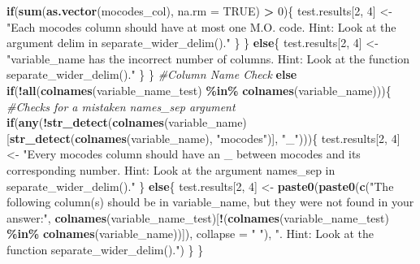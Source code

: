\documentclass[
  12pt,
]{book}
\newenvironment{Shaded}{\begin{snugshade}}{\end{snugshade}}
\newcommand{\AttributeTok}[1]{\textcolor[rgb]{0.13,0.29,0.53}{#1}}
\newcommand{\CommentTok}[1]{\textcolor[rgb]{0.56,0.35,0.01}{\textit{#1}}}
\newcommand{\ConstantTok}[1]{\textcolor[rgb]{0.56,0.35,0.01}{#1}}
\newcommand{\ControlFlowTok}[1]{\textcolor[rgb]{0.13,0.29,0.53}{\textbf{#1}}}
\newcommand{\DecValTok}[1]{\textcolor[rgb]{0.00,0.00,0.81}{#1}}
\newcommand{\FunctionTok}[1]{\textcolor[rgb]{0.13,0.29,0.53}{\textbf{#1}}}
\newcommand{\NormalTok}[1]{#1}
\newcommand{\OtherTok}[1]{\textcolor[rgb]{0.56,0.35,0.01}{#1}}
\newcommand{\SpecialCharTok}[1]{\textcolor[rgb]{0.81,0.36,0.00}{\textbf{#1}}}
\newcommand{\StringTok}[1]{\textcolor[rgb]{0.31,0.60,0.02}{#1}}
\begin{document}
\begin{Shaded}
\begin{Highlighting}[]
    \ControlFlowTok{if}\NormalTok{(}\FunctionTok{sum}\NormalTok{(}\FunctionTok{as.vector}\NormalTok{(mocodes\_col), }\AttributeTok{na.rm =} \ConstantTok{TRUE}\NormalTok{) }\SpecialCharTok{\textgreater{}} \DecValTok{0}\NormalTok{)\{}
\NormalTok{      test.results[}\DecValTok{2}\NormalTok{, }\DecValTok{4}\NormalTok{] }\OtherTok{\textless{}{-}} \StringTok{"Each \textasciigrave{}mocodes\textasciigrave{} column should have at most one M.O. code. Hint: Look at the argument \textasciigrave{}delim\textasciigrave{} in \textasciigrave{}separate\_wider\_delim()\textasciigrave{}."}
\NormalTok{    \}}
\NormalTok{  \}}
  \ControlFlowTok{else}\NormalTok{\{}
\NormalTok{    test.results[}\DecValTok{2}\NormalTok{, }\DecValTok{4}\NormalTok{] }\OtherTok{\textless{}{-}} \StringTok{"\textasciigrave{}variable\_name\textasciigrave{} has the incorrect number of columns. Hint: Look at the function \textasciigrave{}separate\_wider\_delim()\textasciigrave{}."}
\NormalTok{  \}}
\NormalTok{\}}
\CommentTok{\#Column Name Check  }
\ControlFlowTok{else} \ControlFlowTok{if}\NormalTok{(}\SpecialCharTok{!}\FunctionTok{all}\NormalTok{(}\FunctionTok{colnames}\NormalTok{(variable\_name\_test) }\SpecialCharTok{\%in\%} \FunctionTok{colnames}\NormalTok{(variable\_name)))\{}
  \CommentTok{\#Checks for a mistaken \textasciigrave{}names\_sep\textasciigrave{} argument }
  \ControlFlowTok{if}\NormalTok{(}\FunctionTok{any}\NormalTok{(}\SpecialCharTok{!}\FunctionTok{str\_detect}\NormalTok{(}\FunctionTok{colnames}\NormalTok{(variable\_name)[}\FunctionTok{str\_detect}\NormalTok{(}\FunctionTok{colnames}\NormalTok{(variable\_name), }\StringTok{"mocodes"}\NormalTok{)], }\StringTok{"\_"}\NormalTok{)))\{}
\NormalTok{    test.results[}\DecValTok{2}\NormalTok{, }\DecValTok{4}\NormalTok{] }\OtherTok{\textless{}{-}} \StringTok{"Every \textasciigrave{}mocodes\textasciigrave{} column should have an \textasciigrave{}\_\textasciigrave{} between \textasciigrave{}mocodes\textasciigrave{} and its corresponding number. Hint: Look at the argument \textasciigrave{}names\_sep\textasciigrave{} in \textasciigrave{}separate\_wider\_delim().\textasciigrave{}"}
\NormalTok{  \} }
  \ControlFlowTok{else}\NormalTok{\{}
\NormalTok{    test.results[}\DecValTok{2}\NormalTok{, }\DecValTok{4}\NormalTok{] }\OtherTok{\textless{}{-}} \FunctionTok{paste0}\NormalTok{(}\FunctionTok{paste0}\NormalTok{(}\FunctionTok{c}\NormalTok{(}\StringTok{"The following column(s) should be in \textasciigrave{}variable\_name\textasciigrave{}, but they were not found in your answer:"}\NormalTok{,}
                                   \FunctionTok{colnames}\NormalTok{(variable\_name\_test)[}\SpecialCharTok{!}\NormalTok{(}\FunctionTok{colnames}\NormalTok{(variable\_name\_test) }\SpecialCharTok{\%in\%} \FunctionTok{colnames}\NormalTok{(variable\_name))]),}
                                   \AttributeTok{collapse =} \StringTok{"  "}\NormalTok{), }\StringTok{". Hint: Look at the function \textasciigrave{}separate\_wider\_delim().\textasciigrave{}"}\NormalTok{)}
\NormalTok{  \}}
\NormalTok{\}}


\end{Highlighting}
\end{Shaded}
\end{document}
